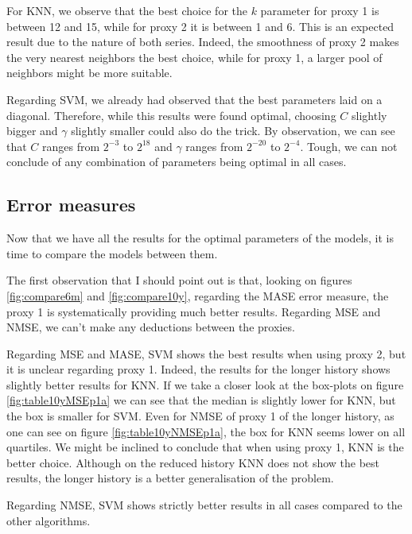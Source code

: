 \documentclass[11pt,a4paper,oneside]{book}
\begin{document}
For KNN, we observe that the best choice for the $k$ parameter for proxy 1 is between 12 and 15, while for proxy 2 it is between 1 and 6. 
This is an expected result due to the nature of both series. Indeed, the smoothness of proxy 2 makes the very nearest neighbors the best choice, while for proxy 1, a larger pool of neighbors might be more suitable.

Regarding SVM, we already had observed that the best parameters laid on a diagonal. Therefore, while this results were found optimal, choosing $C$ slightly bigger and $\gamma$ slightly smaller could also do the trick. By observation, we can see that $C$ ranges from $2^{-3}$ to $2^{18}$ and $\gamma$ ranges from $2^{-20}$ to $2^{-4}$. Tough, we can not conclude of any combination of parameters being optimal in all cases. 






\subsection{Error measures}

Now that we have all the results for the optimal parameters of the models, it is time to compare the models between them.

The first observation that I should point out is that, looking on figures \ref{fig:compare6m} and \ref{fig:compare10y}, regarding the MASE error measure, the proxy 1 is systematically providing much better results. Regarding MSE and NMSE, we can't make any deductions between the proxies. 





Regarding MSE and MASE, SVM shows the best results when using proxy 2, but it is unclear regarding proxy 1. Indeed, the results for the longer history shows slightly better results for KNN. If we take a closer look at the box-plots on figure \ref{fig:table10yMSEp1a} we can see that the median is slightly lower for KNN, but the box is smaller for SVM. Even for NMSE of proxy 1 of the longer history, as one can see on figure \ref{fig:table10yNMSEp1a}, the box for KNN seems lower on all quartiles. We might be inclined to conclude that when using proxy 1, KNN is the better choice. Although on the reduced history KNN does not show the best results, the longer history is a better generalisation of the problem.

Regarding NMSE, SVM shows strictly better results in all cases compared to the other algorithms.
\end{document}
